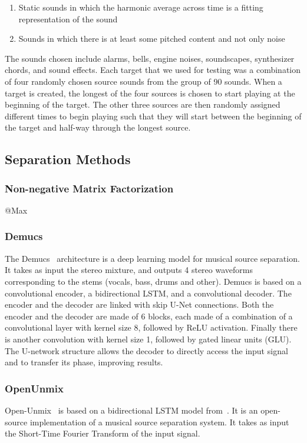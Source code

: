 \documentclass{article}
\begin{document}
		\begin{enumerate}
			\item Static sounds in which the harmonic average across time is a fitting representation of the sound
			\item Sounds in which there is at least some pitched content and not only noise
		\end{enumerate}			
		The sounds chosen include alarms, bells, engine noises, soundscapes, synthesizer chords, and sound effects. Each target that we used for testing was a combination of four randomly chosen source sounds from the group of 90 sounds. 
		When a target is created, the longest of the four sources is chosen to start playing at the beginning of the target. The other three sources are then randomly assigned different times to begin playing such that they will start between the beginning of the target and half-way through the longest source.
		
		\subsection{Separation Methods}
	
			\subsubsection{Non-negative Matrix Factorization}
			@Max 
			
			\subsubsection{Demucs}
			The Demucs~\cite{demucs} architecture is a deep learning model for musical source separation. It takes as input the stereo mixture, and outputs 4 stereo waveforms corresponding to the stems (vocals, bass, drums and other). Demucs is based on a convolutional encoder, a bidirectional LSTM, and a convolutional decoder. The encoder and the decoder are linked with skip U-Net connections. Both the encoder and the decoder are made of 6 blocks, each made of a combination of a convolutional layer with kernel size 8, followed by ReLU activation. Finally there is another convolution with kernel size 1, followed by gated linear units (GLU). The U-network structure allows the decoder to directly access the input signal and to transfer its phase, improving results.	
			
			\subsubsection{OpenUnmix}
			Open-Unmix~\cite{open-unmix} is based on a bidirectional LSTM model from~\cite{Uhlich2017}. It is an open-source implementation of a musical source separation system. It takes as input the Short-Time Fourier Transform of the input signal. 
			
\end{document}
